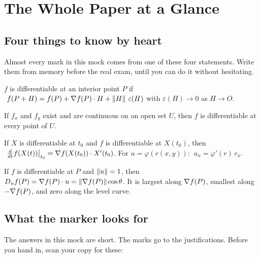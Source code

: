 \renewcommand{\chapribbontext}{Summary}
\chapter{The Whole Paper at a Glance}\label{ch:wrap}

\section{Four things to know by heart}

Almost every mark in this mock comes from one of these four statements. Write them from memory
before the real exam, until you can do it without hesitating.

\begin{defi}[Differentiability]
$f$ is differentiable at an interior point $P$ if
$\ f(P+H)=f(P)+\nabla f(P)\cdot H+\left\lVert H\right\rVert\,\varepsilon(H)$ with $\varepsilon(H)\to0$ as $H\to O$.
\end{defi}

\begin{thm}
If $f_x$ and $f_y$ exist and are continuous on an open set $U$, then $f$ is differentiable at every point of $U$.
\end{thm}

\begin{thm}
If $X$ is differentiable at $t_0$ and $f$ is differentiable at $X(t_0)$, then
$\ \frac{d}{dt}f(X(t))\big|_{t_0}=\nabla f(X(t_0))\cdot X'(t_0)$. For $u=\varphi(r(x,y))$:
$\ u_x=\varphi'(r)\,r_x$.
\end{thm}

\begin{thm}
If $f$ is differentiable at $P$ and $\left\lVert u\right\rVert=1$, then $D_uf(P)=\nabla f(P)\cdot u=\left\lVert \nabla f(P)\right\rVert\cos\theta$.
It is largest along $\nabla f(P)$, smallest along $-\nabla f(P)$, and zero along the level curve.
\end{thm}

\clearpage
\section{What the marker looks for}

The answers in this mock are short. The marks go to the justifications. Before you hand in, scan
your copy for these:

